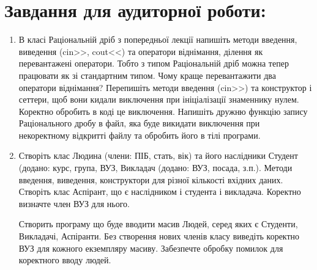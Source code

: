 \documentclass[a5paper,titlepage,openany,twoside,draft]{book_unv}%
\begin{document}
\section{Завдання для аудиторної роботи:}

\begin{enumerate}
\def\labelenumi{\arabic{enumi})}

\item
  В класі Раціональній дріб з попередньої лекції напишіть методи
  введення, виведення (cin\textgreater{}\textgreater{},
  cout\textless{}\textless{}) та оператори віднімання, ділення як
  перевантажені оператори. Тобто з типом Раціональній дріб можна тепер
  працювати як зі стандартним типом. Чому краще перевантажити два
  оператори віднімання? Перепишіть методи введення
  (cin\textgreater{}\textgreater{}) та конструктор і сеттери, щоб вони
  кидали виключення при ініціалізації знаменнику нулем. Коректно
  обробить в коді це виключення. Напишіть дружню функцію запису
  Раціонального дробу в файл, яка буде викидати виключення при
  некоректному відкритті файлу та обробить його в тілі програми.

\item
  Створіть клас Людина (члени: ПІБ, стать, вік) та його наслідники
  Студент (додано: курс, група, ВУЗ, Викладач (додано: ВУЗ, посада,
  з.п.). Методи введення, виведення, конструктори для різної кількості
  вхідних даних. Створіть клас Аспірант, що є наслідником і студента і викладача.
 Коректно визначте член ВУЗ для нього. 

 Створить програму що буде вводити масив Людей, серед яких є Студенти,
Викладачі, Аспіранти. Без створення нових членів класу виведіть коректно
ВУЗ для кожного екземпляру масиву. Забезпечте обробку помилок для коректного вводу людей.
\end{enumerate}
\end{document}
